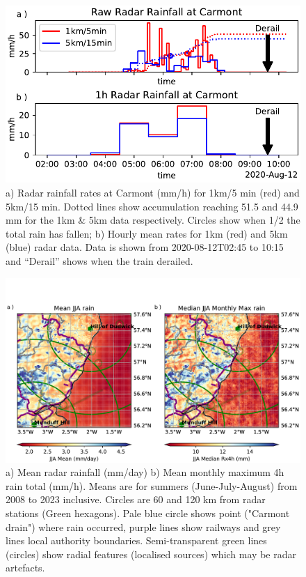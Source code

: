 \documentclass[11pt,a4paper]{article}
\begin{document}
\begin{figure}[ht!]
	\centering
	\includegraphics[width=0.5\linewidth]{radar_carmont}
	\caption{a) Radar rainfall rates at Carmont (mm/h) for 1km/5 min (red) and 5km/15 min. Dotted lines show accumulation reaching 51.5 and 44.9 mm for the 1km \& 5km data respectively. Circles show when 1/2 the total rain has fallen; b) Hourly mean rates for 1km (red) and 5km (blue) radar data. Data is shown from 2020-08-12T02:45 to 10:15 and ``Derail'' shows when the train derailed. }
	\label{fig:aug2020_rain}
\end{figure}

\begin{figure}[ht!]
	\centering
	\includegraphics[width=\linewidth]{radar_jja}
	\caption{a) Mean radar rainfall (mm/day) b) Mean monthly maximum 4h rain total (mm/h). Means are for summers (June-July-August) from 2008 to 2023 inclusive. Circles are  60 and 120 km from radar stations (Green hexagons). Pale blue circle shows point ("Carmont drain") where rain occurred, purple lines show railways and grey lines local authority boundaries. Semi-transparent green lines (circles) show radial features (localised sources) which may be radar artefacts. }
	\label{fig:radar_jja}
\end{figure}
\end{document}
